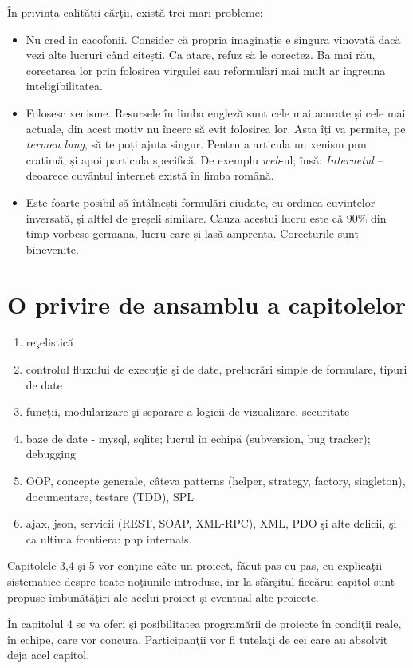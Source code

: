În privința calității cărţii, există trei mari probleme:
\begin{itemize}
\item Nu cred în cacofonii. Consider că propria imaginație e singura vinovată
dacă {\glqq}vezi{\grqq} alte lucruri când citești. Ca atare, refuz să le corectez.
Ba mai rău, corectarea lor prin folosirea virgulei sau reformulări mai mult
ar îngreuna inteligibilitatea.
\item Folosesc xenisme. Resursele în limba engleză sunt cele mai acurate și
cele mai actuale, din acest motiv nu încerc să evit folosirea lor.
Asta îți va permite, pe \textit{termen lung}, să te poți ajuta singur. Pentru a
articula un xenism pun cratimă, și apoi particula specifică. De exemplu
\textsl{web}-ul; însă: \textit{Internetul} -- deoarece cuvântul internet există în
limba română.
\item Este foarte posibil să întâlnești formulări ciudate, cu ordinea
cuvintelor inversată, și altfel de greșeli similare. Cauza acestui lucru este că
90\% din timp vorbesc germana, lucru care-și lasă amprenta.
Corecturile sunt binevenite.
\end{itemize}

{}
\section*{O privire de ansamblu a capitolelor}

\begin{enumerate}
\item reţelistică
\item controlul fluxului de execuţie şi de date, prelucrări simple de formulare, tipuri de date
\item funcţii, modularizare şi separare a logicii de vizualizare. securitate
\item baze de date - mysql, sqlite; lucrul în echipă (subversion, bug tracker); debugging
\item OOP, concepte generale, câteva patterns (helper, strategy, factory, singleton),
documentare, testare (TDD), SPL
\item ajax, json, servicii (REST, SOAP, XML-RPC), XML, PDO şi alte delicii, şi ca
{\glqq}ultima frontiera{\grqq}: php internals.
\end{enumerate}

Capitolele 3,4 şi 5 vor conţine câte un proiect, făcut pas cu pas, cu explicaţii sistematice
despre toate noţiunile introduse, iar la sfârşitul fiecărui capitol sunt propuse îmbunătăţiri
ale acelui proiect şi eventual alte proiecte.

În capitolul 4 se va oferi şi posibilitatea programării de proiecte în condiţii reale, în
echipe, care vor concura.
Participanţii vor fi tutelaţi de cei care au absolvit deja acel capitol.